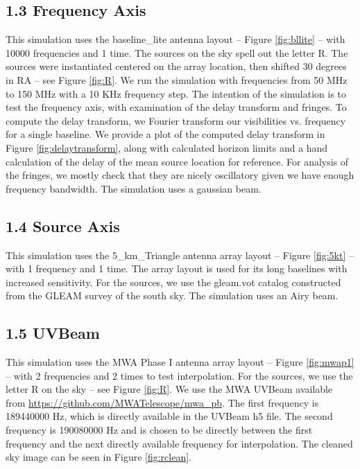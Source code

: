 \documentclass{article}
\begin{document}
\subsection*{1.3 Frequency Axis}

This simulation uses the baseline\_lite antenna layout -- Figure \ref{fig:bllite} -- with 10000 frequencies and 1 time. The sources on the sky spell out the letter R. The sources were instantiated centered on the array location, then shifted 30 degrees in RA -- see Figure \ref{fig:R}. We run the simulation with frequencies from 50 MHz to 150 MHz with a 10 KHz frequency step. The intention of the simulation is to test the frequency axis, with examination of the delay transform and fringes. To compute the delay transform, we Fourier transform our visibilities vs. frequency for a single baseline. We provide a plot of the computed delay transform in Figure \ref{fig:delaytransform}, along with calculated horizon limits and a hand calculation of the delay of the mean source location for reference. For analysis of the fringes, we mostly check that they are nicely oscillatory given we have enough frequency bandwidth. The simulation uses a gaussian beam.

\subsection*{1.4 Source Axis}

This simulation uses the 5\_km\_Triangle antenna array layout -- Figure \ref{fig:5kt} -- with 1 frequency and 1 time. The array layout is used for its long baselines with increased sensitivity. For the sources, we use the gleam.vot catalog constructed from the GLEAM survey of the south sky. The simulation uses an Airy beam.

\subsection*{1.5 UVBeam}

This simulation uses the MWA Phase I antenna array layout -- Figure \ref{fig:mwap1} -- with 2 frequencies and 2 times to test interpolation. For the sources, we use the letter R on the sky -- see Figure \ref{fig:R}. We use the MWA UVBeam available from \url{https://github.com/MWATelescope/mwa_pb}. The first frequency is 189440000 Hz, which is directly available in the UVBeam h5 file. The second frequency is 190080000 Hz and is chosen to be directly between the first frequency and the next directly available frequency for interpolation. The cleaned sky image can be seen in Figure \ref{fig:rclean}.
\end{document}
